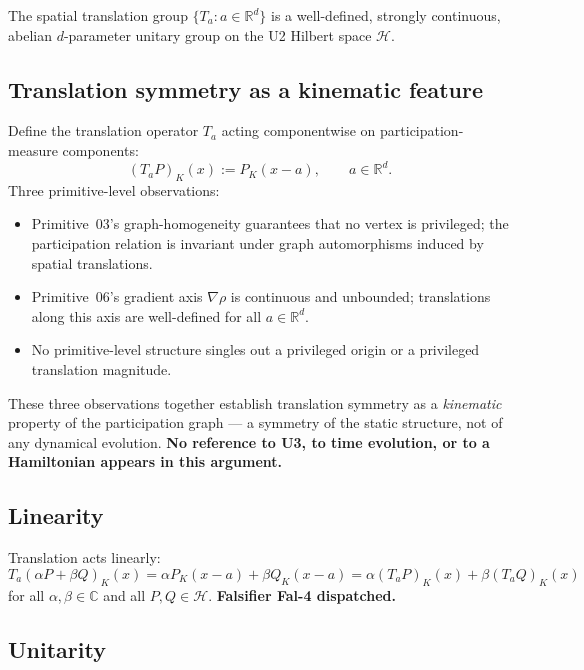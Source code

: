 \documentclass[11pt,a4paper]{article}
\begin{document}
The spatial translation group $\{T_a : a \in \mathbb{R}^d\}$ is a well-defined, strongly continuous, abelian $d$-parameter unitary group on the U2 Hilbert space $\mathcal{H}$.

\subsection{Translation symmetry as a kinematic feature}

Define the translation operator $T_a$ acting componentwise on participation-measure components:
\begin{equation}
(T_a P)_K(x) := P_K(x - a), \qquad a \in \mathbb{R}^d. \label{eq:Ta-def}
\end{equation}
Three primitive-level observations:

\begin{itemize}
  \item[\textbf{(i)}] Primitive~03's graph-homogeneity guarantees that no vertex is privileged; the participation relation is invariant under graph automorphisms induced by spatial translations.
  \item[\textbf{(ii)}] Primitive~06's gradient axis $\nabla\rho$ is continuous and unbounded; translations along this axis are well-defined for all $a \in \mathbb{R}^d$.
  \item[\textbf{(iii)}] No primitive-level structure singles out a privileged origin or a privileged translation magnitude.
\end{itemize}

These three observations together establish translation symmetry as a \emph{kinematic} property of the participation graph --- a symmetry of the static structure, not of any dynamical evolution. \textbf{No reference to U3, to time evolution, or to a Hamiltonian appears in this argument.}

\subsection{Linearity}

Translation acts linearly:
\[
T_a (\alpha P + \beta Q)_K(x) = \alpha P_K(x - a) + \beta Q_K(x - a) = \alpha (T_a P)_K(x) + \beta (T_a Q)_K(x)
\]
for all $\alpha, \beta \in \mathbb{C}$ and all $P, Q \in \mathcal{H}$. \textbf{Falsifier Fal-4 dispatched.}

\subsection{Unitarity}
\end{document}
